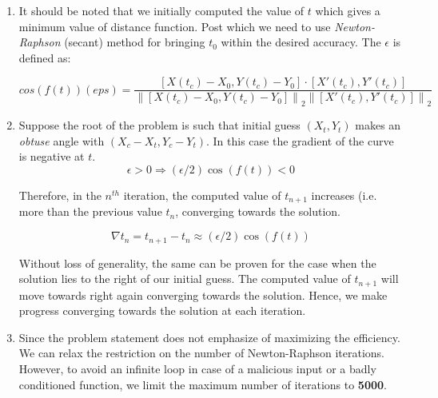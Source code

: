 \documentclass[12pt]{article}
\begin{document}
\begin{enumerate}
    \item 
    It should be noted that we initially computed the value of $t$ which gives a minimum value of distance function. Post which we need to use \textit{Newton-Raphson} (secant) method for bringing $t_0$ within the desired accuracy. The $\epsilon$ is defined as:
    
    \begin{equation}
        cos(f(t)) (eps) =
        \frac{[X(t_c) - X_0, Y(t_c) - Y_0] \cdot [X'(t_c), Y'(t_c)]}{\left\lVert [X(t_c) - X_0, Y(t_c) - Y_0]\right\rVert_2 \left\lVert [X'(t_c), Y'(t_c)]\right\rVert_2}
    \end{equation}
    
	\item
	  Suppose the root of the problem is such that initial guess $(X_t, Y_t)$ makes an \textit{obtuse} angle with $(X_c - X_t, Y_c - Y_t)$. In this case the gradient of the curve is negative at $t$. 
    \begin{equation}
        \epsilon > 0 
        \Rightarrow (\epsilon/2)\cos(f(t)) < 0
    \end{equation}
    
    Therefore, in the $n^{th}$ iteration, the computed value of $t_{n+1}$ increases (i.e. more than the previous value $t_n$, converging towards the solution.
    
    \begin{equation}
        \nabla t_n  = t_{n+1} - t_n \approx (\epsilon/2)\cos(f(t))
    \end{equation}
    
    Without loss of generality, the same can be proven for the case when the solution lies to the right of our initial guess. The computed value of $t_{n+1}$ will move towards right again converging towards the solution.
    Hence, we make progress converging towards the solution at each iteration.
    
        
    \item 
    Since the problem statement does not emphasize of maximizing the efficiency. We can relax the restriction on the number of Newton-Raphson iterations. However, to avoid an infinite loop in case of a malicious input or a badly conditioned function, we limit the maximum number of iterations to \textbf{5000}.
    
\end{enumerate}
\end{document}
